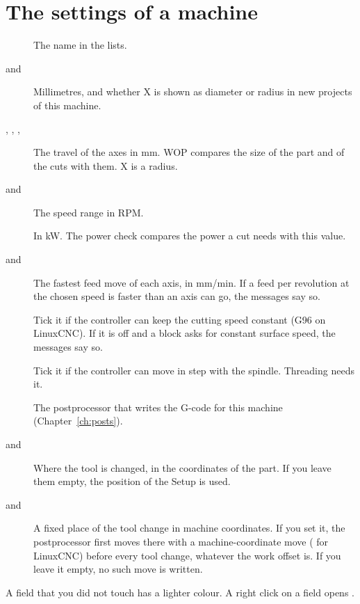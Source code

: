 \section{The settings of a machine}\label{sec:machines:settings}
\begin{description}
\item[] The name in the lists.
\item[ and ] Millimetres, and whether X is shown as diameter or radius in new projects of this machine.
\item[, , , ] The travel of the axes in mm. WOP compares the size of the part and of the cuts with them. X is a radius.
\item[ and ] The speed range in RPM.
\item[] In kW. The power check compares the power a cut needs with this value.
\item[ and ] The fastest feed move of each axis, in mm/min. If a feed per revolution at the chosen speed is faster than an axis can go, the messages say so.
\item[] Tick it if the controller can keep the cutting speed constant (G96 on LinuxCNC). If it is off and a block asks for constant surface speed, the messages say so.
\item[] Tick it if the controller can move in step with the spindle. Threading needs it.
\item[] The postprocessor that writes the G-code for this machine (Chapter~\ref{ch:posts}).
\item[ and ] Where the tool is changed, in the coordinates of the part. If you leave them empty, the position of the Setup is used.
\item[ and ] A fixed place of the tool change in machine coordinates. If you set it, the postprocessor first moves there with a machine-coordinate move ( for LinuxCNC) before every tool change, whatever the work offset is. If you leave it empty, no such move is written.
\end{description}

A field that you did not touch has a lighter colour. A right click on a field opens .

